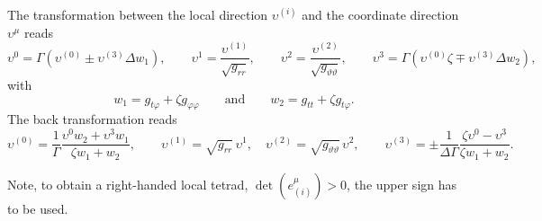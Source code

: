 \documentclass[10pt,twoside,notitlepage,a4paper,fleqn,openbib]{report}
\begin{document}
The transformation between the local direction $\upsilon^{(i)}$ and the coordinate direction $\upsilon^{\mu}$ reads
\begin{equation}
  \upsilon^0 = \Gamma\left(\upsilon^{(0)}\pm \upsilon^{(3)}\Delta w_1\right),\qquad \upsilon^1 = \frac{\upsilon^{(1)}}{\sqrt{g_{rr}}},\qquad \upsilon^2 = \frac{\upsilon^{(2)}}{\sqrt{g_{\vartheta\vartheta}}},\qquad \upsilon^3 = \Gamma\left(\upsilon^{(0)}\zeta\mp \upsilon^{(3)}\Delta w_2\right),
\end{equation}
with
\begin{equation}
  w_1 = g_{t\varphi}+\zeta g_{\varphi\varphi}\qquad\text{and}\qquad w_2 = g_{tt}+\zeta g_{t\varphi}.
\end{equation}
The back transformation reads
\begin{equation}
  \upsilon^{(0)} = \frac{1}{\Gamma}\frac{\upsilon^0w_2+\upsilon^3w_1}{\zeta w_1+w_2},\qquad \upsilon^{(1)} = \sqrt{g_{rr}}\,\upsilon^1,\quad \upsilon^{(2)} = \sqrt{g_{\vartheta\vartheta}}\,\upsilon^2,\qquad \upsilon^{(3)} = \pm\frac{1}{\Delta\Gamma}\frac{\zeta \upsilon^0-\upsilon^3}{\zeta w_1+w_2}.
\end{equation}

Note, to obtain a right-handed local tetrad, $\det\left(e_{(i)}^{\mu}\right)>0$, the upper sign has to be used.

\end{document}
